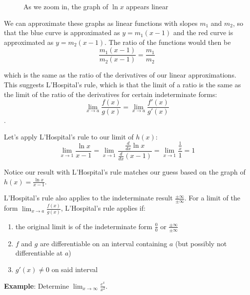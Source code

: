 \begin{figure}[htbp]
\centering
{}
\caption{As we zoom in, the graph of $\ln{x}$ appears linear}
\label{fig:zoom2}
\end{figure}

We can approximate these graphs as linear functions with slopes $m_1$ and 
$m_2$, so that the blue curve is approximated as $y=m_1(x-1)$ and the red 
curve is approximated as $y=m_2(x-1)$. The ratio of the functions would then 
be 
$$\frac{m_1(x-1)}{m_2(x-1)}=\frac{m_1}{m_2}$$ 

which is the same as the ratio of the derivatives of our linear approximations. 
This suggests L'Hospital's rule, which is that the limit of a ratio is the same as the 
limit of the ratio of the derivatives for certain indeterminate forms: 
$$\lim_{x\to a}\frac{f(x)}{g(x)}=\lim_{x\to a}\frac{f'(x)}{g'(x)}$$.

Let's apply L'Hospital's rule to our limit of $h(x)$:
$$\lim_{x\to 1} \frac{\ln{x}}{x - 1} = \lim_{x \to 1} \frac{\frac{d}{dx} 
\ln{x}}{\frac{d}{dx} (x - 1)} = \lim_{x \to 1} \frac{\frac{1}{x}}{1}=1$$

Notice our result with L'Hospital's rule matches our guess based on the graph 
of $h(x) = \frac{\ln{x}}{x-1}$. 

L'Hospital's rule also applies to the indeterminate result $\frac{\pm \infty}
{\pm \infty}$. For a limit of the form $\lim_{x\to a}\frac{f(x)}{g(x)}$, 
L'Hospital's rule applies if:
\begin{enumerate}
    \item the original limit is of the indeterminate form $\frac{0}{0}$ or 
    $\frac{\pm \infty}{\pm \infty}$
    \item $f$ and $g$ are differentiable on an interval containing $a$ (but 
    possibly not differentiable at $a$)
    \item $g'(x) \neq 0$ on said interval
\end{enumerate}

\textbf{Example}: Determine $\lim_{x \to \infty} \frac{e^x}{x^2}$.

